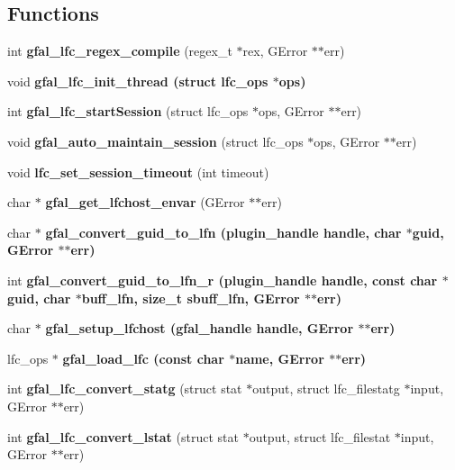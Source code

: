\subsection*{Functions}
\begin{CompactItemize}
\item 
int \textbf{gfal\_\-lfc\_\-regex\_\-compile} (regex\_\-t $\ast$rex, GError $\ast$$\ast$err)\label{lfc__ifce__ng_8c_4ecadc4bf36b4b23af7beb949f6190be}

\item 
void \bf{gfal\_\-lfc\_\-init\_\-thread} (struct lfc\_\-ops $\ast$ops)
\item 
int \textbf{gfal\_\-lfc\_\-start\-Session} (struct lfc\_\-ops $\ast$ops, GError $\ast$$\ast$err)\label{lfc__ifce__ng_8c_191824f5c6bfee67e81f0c495e9bb778}

\item 
void \textbf{gfal\_\-auto\_\-maintain\_\-session} (struct lfc\_\-ops $\ast$ops, GError $\ast$$\ast$err)\label{lfc__ifce__ng_8c_9be7f93578b4772ec1498fe197f3c2c4}

\item 
void \textbf{lfc\_\-set\_\-session\_\-timeout} (int timeout)\label{lfc__ifce__ng_8c_656ee4eb29a1bcf4e9e1d9a4aafd4c82}

\item 
char $\ast$ \textbf{gfal\_\-get\_\-lfchost\_\-envar} (GError $\ast$$\ast$err)\label{lfc__ifce__ng_8c_9a5b8e8e30853b920e3bbe41062e1d25}

\item 
char $\ast$ \bf{gfal\_\-convert\_\-guid\_\-to\_\-lfn} (plugin\_\-handle handle, char $\ast$guid, GError $\ast$$\ast$err)
\item 
int \bf{gfal\_\-convert\_\-guid\_\-to\_\-lfn\_\-r} (plugin\_\-handle handle, const char $\ast$guid, char $\ast$buff\_\-lfn, size\_\-t sbuff\_\-lfn, GError $\ast$$\ast$err)
\item 
char $\ast$ \bf{gfal\_\-setup\_\-lfchost} (gfal\_\-handle handle, GError $\ast$$\ast$err)
\item 
lfc\_\-ops $\ast$ \bf{gfal\_\-load\_\-lfc} (const char $\ast$name, GError $\ast$$\ast$err)
\item 
int \textbf{gfal\_\-lfc\_\-convert\_\-statg} (struct stat $\ast$output, struct lfc\_\-filestatg $\ast$input, GError $\ast$$\ast$err)\label{lfc__ifce__ng_8c_79cceda78f871c9bd8568a636dd31206}

\item 
int \textbf{gfal\_\-lfc\_\-convert\_\-lstat} (struct stat $\ast$output, struct lfc\_\-filestat $\ast$input, GError $\ast$$\ast$err)\label{lfc__ifce__ng_8c_16e8d4c4177c6e1d39c1850f06042f97}


\end{CompactItemize}
